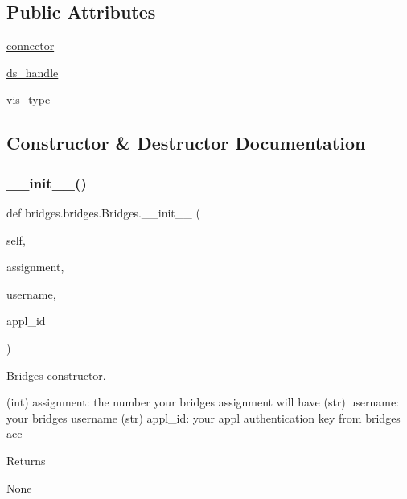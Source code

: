 \subsection*{Public Attributes}
\begin{DoxyCompactItemize}
\item 
\mbox{\hyperlink{classbridges_1_1bridges_1_1_bridges_a1c02ee44e7a4a3ee2f7d9c7d7da7d09f}{connector}}
\item 
\mbox{\hyperlink{classbridges_1_1bridges_1_1_bridges_a7a6f25612be64d4f3e203d7d37cb4da4}{ds\+\_\+handle}}
\item 
\mbox{\hyperlink{classbridges_1_1bridges_1_1_bridges_a5ca152bf3830e2be1f72247463916f82}{vis\+\_\+type}}
\end{DoxyCompactItemize}


\subsection{Constructor \& Destructor Documentation}
\mbox{\label{classbridges_1_1bridges_1_1_bridges_af174072883f6f269a9fe7cc02e12c276}} 
\subsubsection{\texorpdfstring{\_\_init\_\_()}{\_\_init\_\_()}}
{\footnotesize\ttfamily def bridges.\+bridges.\+Bridges.\+\_\+\+\_\+init\+\_\+\+\_\+ (\begin{DoxyParamCaption}\item[{}]{self,  }\item[{}]{assignment,  }\item[{}]{username,  }\item[{}]{appl\+\_\+id }\end{DoxyParamCaption})}



\mbox{\hyperlink{classbridges_1_1bridges_1_1_bridges}{Bridges}} constructor. 

\begin{DoxyVerb}       (int) assignment: the number your bridges assignment will have
       (str) username: your bridges username
       (str) appl_id: your appl authentication key from bridges acc
\end{DoxyVerb}
 \begin{DoxyReturn}{Returns}


None 
\end{DoxyReturn}


